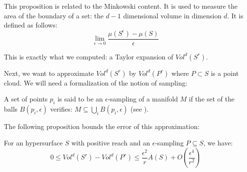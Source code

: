 This proposition is related to the Minkowski content. It is used to measure the
area of the boundary of a set: the $ d-1 $ dimensional volume in dimension $ d
$. It is defined as follows:
$$ \lim\limits_{\epsilon \to 0} \frac{\mu(S^{\epsilon}) - \mu(S)}{\epsilon} $$

This is exactly what we computed: a Taylor expansion of $ Vol^d(S^r) $.

Next, we want to approximate $ Vol^d(S^r) $ by $ Vol^d(P^r) $ where $ P \subset
S $ is a point cloud. We will need a formalization of the notion of sampling:

\begin{definition}
    A set of points $ p_i $ is said to be an $\epsilon$-sampling of a manifold $
    M $ if the set of the balls  $ B(p_i, \epsilon) $ verifies: $ M \subseteq
    \bigcup_i B(p_i, \epsilon) $ (see \cite{amenta1999surface}).
\end{definition}

The following proposition bounds the error of this approximation:

\begin{proposition}
    \label{prop:comp-vol-offsets}
    For an hypersurface $ S $ with positive reach and an $\epsilon$-sampling $ P
    \subseteq S $, we have:
    \begin{equation}
        0 \leq Vol^d(S^r) - Vol^d(P^r) \leq \frac{\epsilon^2}{r} A(S) +
        O(\frac{\epsilon^4}{r^2})
    \end{equation}
\end{proposition}


